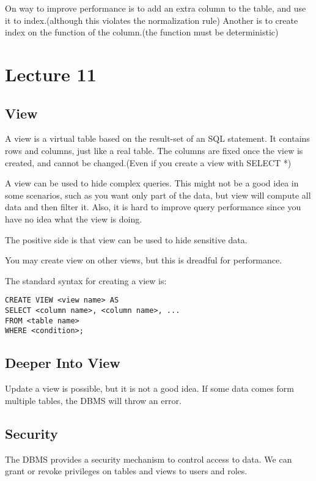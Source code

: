 \documentclass[a4paper,12pt]{article}
\begin{document}
On way to improve performance is to add an extra column to the table, and use it to index.(although this violates the normalization rule)
Another is to create index on the function of the column.(the function must be deterministic)

\section{Lecture 11}

\subsection{View}

A view is a virtual table based on the result-set of an SQL statement.
It contains rows and columns, just like a real table.
The columns are fixed once the view is created, and cannot be changed.(Even if you create a view with SELECT *)

A view can be used to hide complex queries.
This might not be a good idea in some scenarios, such as you want only part of the data, but view will compute all data and then filter it.
Also, it is hard to improve query performance since you have no idea what the view is doing.

The positive side is that view can be used to hide sensitive data.

You may create view on other views, but this is dreadful for performance.

The standard syntax for creating a view is:
\begin{verbatim}
CREATE VIEW <view name> AS
SELECT <column name>, <column name>, ...
FROM <table name>
WHERE <condition>;
\end{verbatim}

\subsection{Deeper Into View}

Update a view is possible, but it is not a good idea.
If some data comes form multiple tables, the DBMS will throw an error.

\subsection{Security}

The DBMS provides a security mechanism to control access to data.
We can grant or revoke privileges on tables and views to users and roles.
\end{document}
